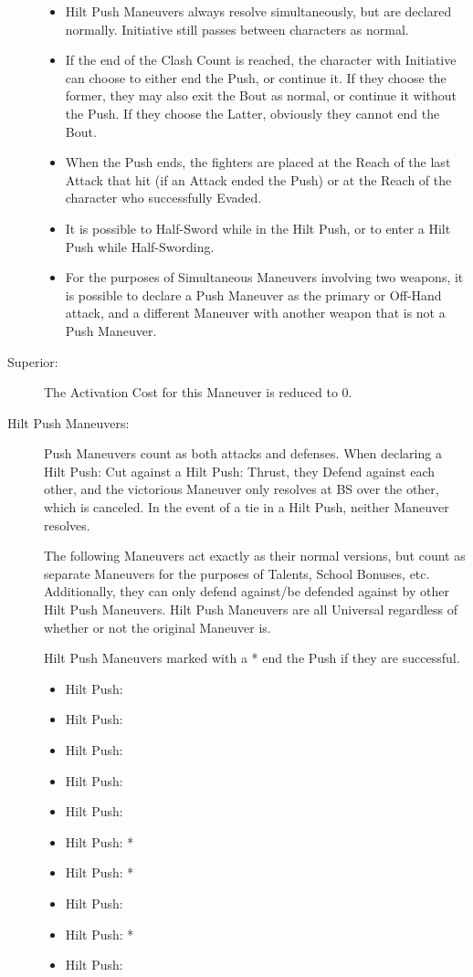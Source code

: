 \documentclass[oneside,11pt,english]{book}
\begin{document}
\begin{description}
\begin{itemize}
  \item Hilt Push Maneuvers always resolve simultaneously, but are declared normally. Initiative still passes 
    between characters as normal. 
  \item If the end of the Clash Count is reached, the character with Initiative
    can choose to either end the Push, or continue it. If they choose the
    former, they may also exit the Bout as normal, or continue it without the
    Push. If they choose the Latter, obviously they cannot end the Bout. 
  \item When the Push ends, the fighters are placed at the Reach of the last
    Attack that hit (if an Attack ended the Push) or at the Reach of the
    character who successfully Evaded. 
  \item It is possible to Half-Sword while in the Hilt Push, or to enter a Hilt Push while Half-Swording. 
  \item For the purposes of Simultaneous Maneuvers involving two weapons, it is
    possible to declare a Push Maneuver as the primary or Off-Hand attack, and a
    different Maneuver with another weapon that is not a Push Maneuver. 
  \end{itemize}
\item [Superior:] The Activation Cost for this Maneuver is reduced to 0. 
\item [Hilt Push Maneuvers:] Push Maneuvers count as both attacks and defenses. When declaring a Hilt Push: 
  Cut against a Hilt Push: Thrust, they Defend against each other, and the victorious Maneuver only 
  resolves at BS over the other, which is canceled. 
  In the event of a tie in a Hilt Push, neither Maneuver resolves. 

  The following Maneuvers act exactly as their normal versions, but count as
  separate Maneuvers for the purposes of Talents, School Bonuses, etc.
  Additionally, they can only defend against/be defended against by other Hilt
  Push Maneuvers. Hilt Push Maneuvers are all Universal regardless of whether or
  not the original Maneuver is. 

  Hilt Push Maneuvers marked with a * end the Push if they are successful. 
  \begin{itemize}
    [noitemsep]
  \item Hilt Push: 
  \item Hilt Push: 
  \item Hilt Push: 
  \item Hilt Push: 
  \item Hilt Push: 
  \item Hilt Push: *
  \item Hilt Push: *
  \item Hilt Push: 
  \item Hilt Push: *
  \item Hilt Push: 
  \end{itemize}
\end{description}
\end{document}

